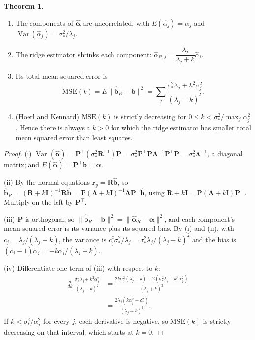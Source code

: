 \documentclass[11pt,a4paper]{article}
\numberwithin{equation}{section}
\theoremstyle{definition}
\newtheorem{thm}{Theorem}[subsection]
\begin{document}
\begin{thm}\label{thm:ridge}
\begin{enumerate}[label=(\roman*)]
\item The components of $\hat{\boldsymbol\alpha}$ are uncorrelated, with $E(\hat\alpha_j) = \alpha_j$ and
$\operatorname{Var}(\hat\alpha_j) = \sigma_*^2/\lambda_j$.
\item The ridge estimator shrinks each component: $\hat\alpha_{R,j} = \dfrac{\lambda_j}{\lambda_j + k}\hat\alpha_j$.
\item Its total mean squared error is
\[
\mathrm{MSE}(k) = E\|\hat{\mathbf{b}}_R - \mathbf{b}\|^2 = \sum_j\frac{\sigma_*^2\lambda_j + k^2\alpha_j^2}{(\lambda_j + k)^2} .
\]
\item (Hoerl and Kennard) $\mathrm{MSE}(k)$ is strictly decreasing for $0 \le k < \sigma_*^2/\max_j\alpha_j^2$.
Hence there is always a $k > 0$ for which the ridge estimator has smaller total mean squared error than
least squares.
\end{enumerate}
\end{thm}

\begin{proof}
(i) $\operatorname{Var}(\hat{\boldsymbol\alpha}) = \mathbf{P}^\top(\sigma_*^2\mathbf{R}^{-1})\mathbf{P} = \sigma_*^2\mathbf{P}^\top\mathbf{P}\boldsymbol\Lambda^{-1}\mathbf{P}^\top\mathbf{P} = \sigma_*^2\boldsymbol\Lambda^{-1}$,
a diagonal matrix; and $E(\hat{\boldsymbol\alpha}) = \mathbf{P}^\top\mathbf{b} = \boldsymbol\alpha$.

(ii) By the normal equations $\mathbf{r}_y = \mathbf{R}\hat{\mathbf{b}}$, so
$\hat{\mathbf{b}}_R = (\mathbf{R} + k\mathbf{I})^{-1}\mathbf{R}\hat{\mathbf{b}} = \mathbf{P}(\boldsymbol\Lambda + k\mathbf{I})^{-1}\boldsymbol\Lambda\mathbf{P}^\top\hat{\mathbf{b}}$,
using $\mathbf{R} + k\mathbf{I} = \mathbf{P}(\boldsymbol\Lambda + k\mathbf{I})\mathbf{P}^\top$. Multiply on the left by $\mathbf{P}^\top$.

(iii) $\mathbf{P}$ is orthogonal, so $\|\hat{\mathbf{b}}_R - \mathbf{b}\|^2 = \|\hat{\boldsymbol\alpha}_R - \boldsymbol\alpha\|^2$, and each
component's mean squared error is its variance plus its squared bias. By (i) and (ii), with
$c_j = \lambda_j/(\lambda_j + k)$, the variance is $c_j^2\sigma_*^2/\lambda_j = \sigma_*^2\lambda_j/(\lambda_j + k)^2$ and the
bias is $(c_j - 1)\alpha_j = -k\alpha_j/(\lambda_j + k)$.

(iv) Differentiate one term of (iii) with respect to $k$:
\begin{align*}
\frac{d}{dk}\,\frac{\sigma_*^2\lambda_j + k^2\alpha_j^2}{(\lambda_j + k)^2}
&= \frac{2k\alpha_j^2(\lambda_j + k) - 2(\sigma_*^2\lambda_j + k^2\alpha_j^2)}{(\lambda_j + k)^3} \\
&= \frac{2\lambda_j(k\alpha_j^2 - \sigma_*^2)}{(\lambda_j + k)^3} .
\end{align*}
If $k < \sigma_*^2/\alpha_j^2$ for every $j$, each derivative is negative, so $\mathrm{MSE}(k)$ is strictly decreasing
on that interval, which starts at $k = 0$.
\end{proof}
\end{document}
